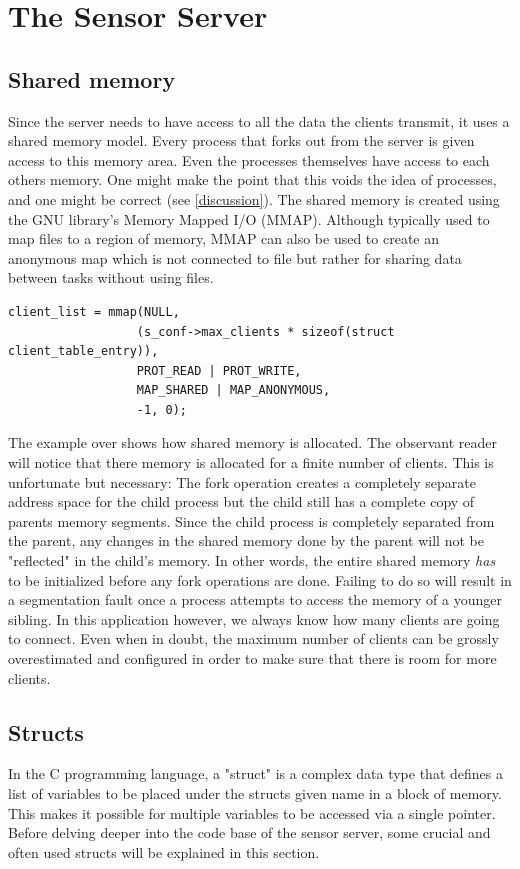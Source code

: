 \documentclass[12pt,english,a4paper]{report}
\begin{document}
\section{The Sensor Server }

\subsection{Shared memory}
Since the server needs to have access to all the data the clients transmit, it uses a shared memory model. Every process that forks out from the server is given access to this memory area. Even the processes themselves have access to each others memory. One might make the point that this voids the idea of processes, and one might be correct (see \ref{discussion}). The shared memory is created using the GNU library's Memory Mapped I/O (MMAP). Although typically used to map files to a region of memory, MMAP can also be used to create an anonymous map which is not connected to file but rather for sharing data between tasks without using files.

\begin{lstlisting}
client_list = mmap(NULL, 
                  (s_conf->max_clients * sizeof(struct client_table_entry)), 
                  PROT_READ | PROT_WRITE,
                  MAP_SHARED | MAP_ANONYMOUS,
                  -1, 0);
\end{lstlisting}
The example over shows how shared memory is allocated. The observant reader will notice that there memory is allocated for a finite number of clients. This is unfortunate but necessary: The fork operation creates a completely separate address space for the child process but the child still has a complete copy of parents memory segments. Since the child process is completely separated from the parent, any changes in the shared memory done by the parent will not be "reflected" in the child's memory. In other words, the entire shared memory \textit{has} to be initialized before any fork operations are done. Failing to do so will result in a segmentation fault once a process attempts to access the memory of a younger sibling. In this application however, we always know how many clients are going to connect. Even when in doubt, the maximum number of clients can be grossly overestimated and configured in order to make sure that there is room for more clients.

\subsection{Structs}
In the C programming language, a "struct" is a complex data type that defines a list of variables to be placed under the structs given name in a block of memory. This makes it possible for multiple variables to be accessed via a single pointer. Before delving deeper into the code base of the sensor server, some crucial and often used structs will be explained in this section.
\end{document}
